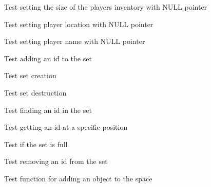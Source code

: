 \begin{DoxyRefList}
\label{test__test000152}%
%
Test setting the size of the player\textquotesingle{}s inventory with NULL pointer  
\item[Global \doxylink{player__test_8c_a2c702753d9e2e3df9ef4abf2d1b9bc8d}{test2\+\_\+player\+\_\+set\+\_\+location} ()]\label{test__test000161}%
%
Test setting player location with NULL pointer  
\item[Global \doxylink{player__test_8c_a6e7ce8ff791f4bf63749df647a44263f}{test2\+\_\+player\+\_\+set\+\_\+name} ()]\label{test__test000142}%
%
Test setting player name with NULL pointer  
\item[Global \doxylink{set__test_8c_ab09827322a313bf97b9757c98c2bdbb0}{test2\+\_\+set\+\_\+add} ()]\label{test__test000171}%
%
Test adding an id to the set  
\item[Global \doxylink{set__test_8c_abed3d273788e23fc31ae7f5ed59277b9}{test2\+\_\+set\+\_\+create} ()]\label{test__test000167}%
%
Test set creation  
\item[Global \doxylink{set__test_8c_a8418524584e638fc6f2d03f726db61f1}{test2\+\_\+set\+\_\+destroy} ()]\label{test__test000169}%
%
Test set destruction  
\item[Global \doxylink{set__test_8c_add28fa44c4fc4f97ae35451cd7979c67}{test2\+\_\+set\+\_\+find} ()]\label{test__test000179}%
%
Test finding an id in the set  
\item[Global \doxylink{set__test_8c_ab9287d9bceed22291dd5be4a9ddbf43f}{test2\+\_\+set\+\_\+get\+\_\+id\+\_\+at\+\_\+pos} ()]\label{test__test000176}%
%
Test getting an id at a specific position  
\item[Global \doxylink{set__test_8c_ab1de430f3e313725897f9b0b1aba543b}{test2\+\_\+set\+\_\+is\+\_\+full} ()]\label{test__test000182}%
%
Test if the set is full  
\item[Global \doxylink{set__test_8c_a38ad5b8f54959557cfd86a9f583e1524}{test2\+\_\+set\+\_\+remove} ()]\label{test__test000174}%
%
Test removing an id from the set  
\item[Global \doxylink{space__test_8c_af5de291847d272d79a524c30b96f6f0c}{test2\+\_\+space\+\_\+add\+\_\+object} ()]\label{test__test000203}%
%
Test function for adding an object to the space  
\item[Global \doxylink{space__test_8c_a012cd3cf37a8d91e2d7098a264c29d65}{test2\+\_\+space\+\_\+create} ()]\label{test__test000185}%

\end{DoxyRefList}
